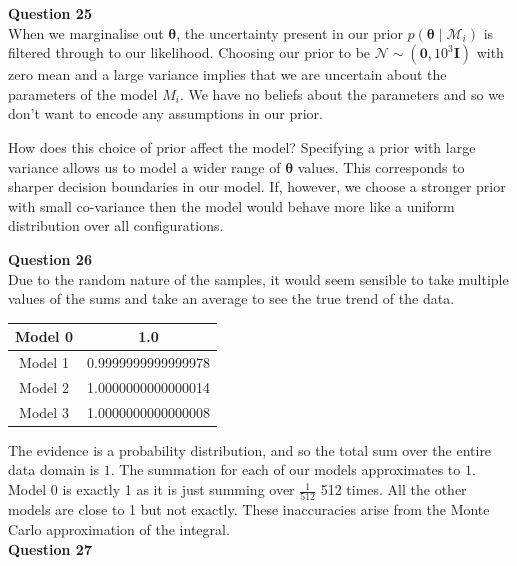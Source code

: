\documentclass[10pt, a4paper, twocolumn]{article} %
\begin{document}
\begin{enumerate}
  \textbf{Question 25}\\
  When we marginalise out $\mathbf{\theta}$, the uncertainty present in our prior $p(\mathbf{\theta}\mid \mathcal{M}_i)$ is filtered through to our likelihood. Choosing our prior to be $\mathcal{N} \sim (\mathbf{0}, 10^3 \mathbf{I})$ with zero mean and a large variance implies that we are uncertain about the parameters of the model $M_i$. We have no beliefs about the parameters and so we don't want to encode any assumptions in our prior.
  
  How does this choice of prior affect the model?
  Specifying a prior with large variance allows us to model a wider range of  $\mathbf{\theta}$ values. This corresponds to sharper decision boundaries in our model. If, however, we choose a stronger prior with small co-variance then the model would behave more like a uniform distribution over all configurations.\cite{murray2005note} 
  
  \textbf{Question 26}\\
  Due to the random nature of the samples, it would seem sensible to take multiple values of the sums and take an average to see the true trend of the data.\\
  
  
  \begin{center}
    \begin{tabular}{ |c|c| } 
    \hline
    Model 0 & 1.0\\
    \hline
    Model 1 & 0.9999999999999978\\
    \hline
    Model 2 & 1.0000000000000014\\ 
    \hline
    Model 3 & 1.0000000000000008\\
    \hline
    \end{tabular}
  \end{center}

  
  The evidence is a probability distribution, and so the total sum over the entire data domain is $1$. The summation for each of our models approximates to $1$. Model 0 is exactly 1 as it is just summing over $\frac{1}{512}$ 512 times. All the other models are close to 1 but not exactly. These inaccuracies arise from the Monte Carlo approximation of the integral.\\
  \textbf{Question 27}
  

\end{enumerate}
\end{document}
